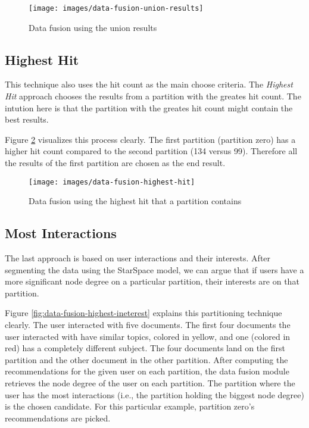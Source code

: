 \begin{figure}[!htb]
    \centering
    \texttt{[image: images/data-fusion-union-results]}
    \caption{Data fusion using the union results}
    \label{fig:data-fusion-union-results}
\end{figure}

\subsection{Highest Hit}
\label{subsec:data-fusion-highest-hit}
This technique also uses the hit count as the main choose criteria. The \emph{Highest Hit} approach chooses the results from a partition with the greates hit count. The intution here is that the partition with the greates hit count might contain the best results.


Figure \ref{fig:data-fusion-highest-hit} visualizes this process clearly. The first partition (partition zero) has a higher hit count compared to the second partition (134 versus 99). Therefore all the results of the first partition are chosen as the end result.

\begin{figure}[!htb]
    \centering
    \texttt{[image: images/data-fusion-highest-hit]}
    \caption{Data fusion using the highest hit that a partition contains}
    \label{fig:data-fusion-highest-hit}
\end{figure}

\subsection{Most Interactions}
\label{subsec:data-fusion-most-interactions}
The last approach is based on user interactions and their interests. After segmenting the data using the StarSpace model, we can argue that if users have a more significant node degree on a particular partition, their interests are on that partition.


Figure \ref{fig:data-fusion-highest-ineterest} explains this partitioning technique clearly. The user interacted with five documents. The first four documents the user interacted with have similar topics, colored in yellow, and one (colored in red) has a completely different subject. The four documents land on the first partition and the other document in the other partition. After computing the recommendations for the given user on each partition, the data fusion module retrieves the node degree of the user on each partition. The partition where the user has the most interactions (i.e., the partition holding the biggest node degree) is the chosen candidate. For this particular example, partition zero's recommendations are picked.


